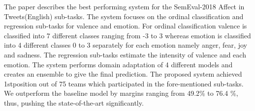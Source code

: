 The paper describes the best performing system for the SemEval-2018 Affect in Tweets(English) sub-tasks. The system focuses on the ordinal classification and regression sub-tasks for valence and emotion.   For ordinal classification valence is classified into 7  different classes ranging from -3 to 3 whereas emotion is classified into 4 different classes 0 to 3 separately for each emotion namely anger,  fear, joy and sadness.  The regression sub-tasks estimate the intensity of valence and each emotion.  The system performs domain adaptation of  4  different models and creates an ensemble to give the final prediction.  The proposed system achieved 1stposition out of 75 teams which participated in the fore-mentioned sub-tasks.   We outperform the baseline model by margins ranging from 49.2\% to 76.4 \%, thus, pushing the state-of-the-art significantly.
